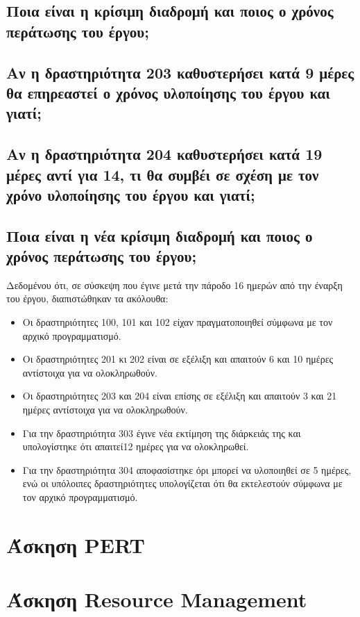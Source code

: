 \documentclass[12pt]{turabian-researchpaper}
\begin{document}
\subsection{Ποια είναι η κρίσιμη διαδρομή και ποιος ο χρόνος περάτωσης του έργου;}

\subsection{Αν η δραστηριότητα 203 καθυστερήσει κατά 9 μέρες θα επηρεαστεί ο χρόνος υλοποίησης του έργου και γιατί;}

\subsection{Αν η δραστηριότητα 204 καθυστερήσει κατά 19 μέρες αντί για 14, τι θα συμβέι σε σχέση με τον χρόνο υλοποίησης του έργου και γιατί;}

\subsection{Ποια είναι η νέα κρίσιμη διαδρομή και ποιος ο χρόνος περάτωσης του έργου;}
Δεδομένου ότι, σε σύσκεψη που έγινε μετά την πάροδο 16 ημερών από την έναρξη του έργου, διαπιστώθηκαν τα ακόλουθα:
\begin{itemize}
    \item Οι δραστηριότητες 100, 101 και 102 είχαν πραγματοποιηθεί σύμφωνα με τον αρχικό προγραμματισμό.
    \item Οι δραστηριότητες 201 κι 202 είναι σε εξέλιξη και απαιτούν 6 και 10 ημέρες αντίστοιχα για να ολοκληρωθούν.
    \item Οι δραστηριότητες 203 και 204 είναι επίσης σε εξέλιξη και απαιτούν 3 και 21 ημέρες αντίστοιχα για να ολοκληρωθούν.
    \item Για την δραστηριότητα 303 έγινε νέα εκτίμηση της διάρκειάς της και υπολογίστηκε ότι απαιτεί12 ημέρες για να ολοκληρωθεί.
    \item Για την δραστηριότητα 304 αποφασίστηκε όρι μπορεί να υλοποιηθεί σε 5 ημέρες, ενώ οι υπόλοιπες δραστηριότητες υπολογίζεται ότι θα εκτελεστούν σύμφωνα με τον αρχικό προγραμματισμό.
\end{itemize}


\section{Άσκηση PERT}

\section{Άσκηση Resource Management}
\end{document}
